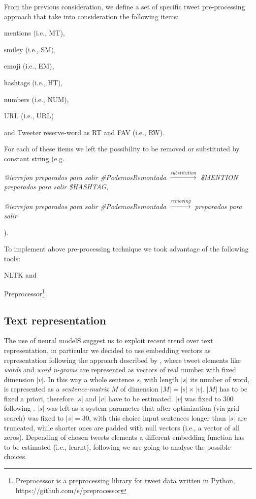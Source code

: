 From the previous consideration, we define a set of specific tweet pre-processing approach that take into consideration the following items:
\begin{enumerate*}
\item mentions (i.e., MT),
\item smiley (i.e., SM),
\item emoji (i.e., EM),
\item hashtags (i.e., HT),
\item numbers (i.e., NUM),
\item URL (i.e., URL)
\item and Tweeter reserve-word as RT and FAV (i.e., RW).
\end{enumerate*}

For each of these items we left the possibility to be removed or substituted by constant string (e.g.
\begin{enumerate*}
\item \emph{@ierrejon preparados para salir \#PodemosRemontada} $\xrightarrow{substitution} $ \emph{\$MENTION preparados para salir \$HASHTAG},
\item \emph{@ierrejon preparados para salir \#PodemosRemontada} $\xrightarrow{removing} $ \emph{preparados para salir}
\end{enumerate*}
).

To implement above pre-processing technique we took advantage of the following tools:
\begin{enumerate*}
\item NLTK \cite{nltk} and 
\item Preprocessor\footnote{Preprocessor is a preprocessing library for tweet data written in Python, https://github.com/s/preprocessor}.
\end{enumerate*}



\subsection{Text representation} \label{subsec:representation}
The use of neural modelS suggest us to exploit recent trend over text representation, in particular we decided to use embedding vectors as representation following the approach described by \cite{bojanowski2016enriching}, where tweet elements like \emph{words} and \emph{word n-grams} are represented as vectors of real number with fixed dimension $|v|$.
In this way a whole sentence $s$, with length $|s|$ its number of word, is represented as a \emph{sentence-matrix} $M$ of dimension $|M| = |s| \times |v|$. $|M|$ has to be fixed a priori, therefore $|s|$ and $|v|$ have to be estimated. $|v|$ was fixed to 300 following \cite{bojanowski2016enriching}. $|s|$ was left as a system parameter that after optimization (via grid search) was fixed to $|s| = 30$, with this choice 
input sentences longer than $|s|$ are truncated, while shorter ones are padded with null vectors (i.e., a vector of all zeros).
Depending of chosen tweets elements a different embedding function has to be estimated (i.e., learnt), following we are going to analyse the possible choices.

